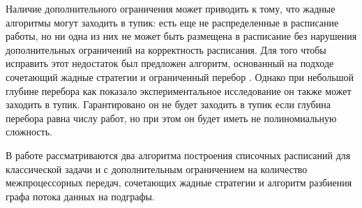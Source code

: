 Наличие дополнительного ограничения может приводить к тому, что жадные алгоритмы могут заходить в тупик: есть еще не распределенные в расписание работы, но ни одна из них не может быть размещена в расписание без нарушения дополнительных ограничений на корректность расписания. Для того чтобы исправить этот недостаток был предложен алгоритм, основанный на подходе сочетающий жадные стратегии и ограниченный перебор \cite{Kostenko_2017}. Однако при небольшой глубине перебора как показало экспериментальное исследование он также может заходить в тупик. Гарантировано он не будет заходить в тупик если глубина перебора равна числу работ, но при этом он будет иметь не полиномиальную сложность.

В работе рассматриваются два алгоритма построения списочных расписаний для классической задачи и с дополнительным ограничением на количество межпроцессорных передач, сочетающих жадные стратегии и алгоритм разбиения графа потока данных на подграфы. 
